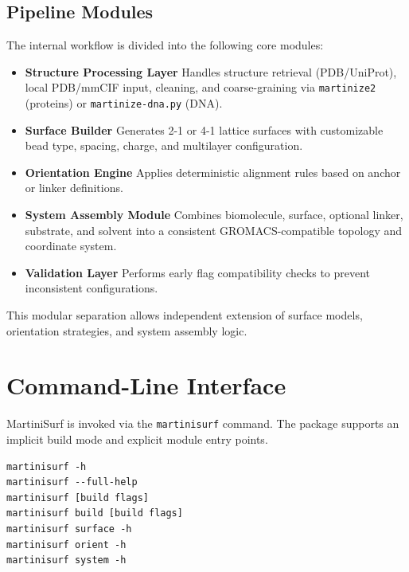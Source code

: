 \documentclass[11pt]{article}
\begin{document}
\subsection{Pipeline Modules}

The internal workflow is divided into the following core modules:

\begin{itemize}
  \item \textbf{Structure Processing Layer}  
  Handles structure retrieval (PDB/UniProt), local PDB/mmCIF input, cleaning, and
  coarse-graining via \texttt{martinize2} (proteins)
  or \texttt{martinize-dna.py} (DNA).

  \item \textbf{Surface Builder}  
  Generates 2-1 or 4-1 lattice surfaces with customizable
  bead type, spacing, charge, and multilayer configuration.

  \item \textbf{Orientation Engine}  
  Applies deterministic alignment rules based on
  anchor or linker definitions.

  \item \textbf{System Assembly Module}  
  Combines biomolecule, surface, optional linker,
  substrate, and solvent into a consistent
  GROMACS-compatible topology and coordinate system.

  \item \textbf{Validation Layer}  
  Performs early flag compatibility checks
  to prevent inconsistent configurations.
\end{itemize}

This modular separation allows independent extension
of surface models, orientation strategies, and system assembly logic.

\section{Command-Line Interface}

MartiniSurf is invoked via the \texttt{martinisurf} command. The package
supports an implicit build mode and explicit module entry points.

\begin{lstlisting}
martinisurf -h
martinisurf --full-help
martinisurf [build flags]
martinisurf build [build flags]
martinisurf surface -h
martinisurf orient -h
martinisurf system -h
\end{lstlisting}
\end{document}
